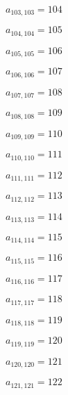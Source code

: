 \documentclass[a4paper,12pt]{article}
\begin{document}
$a _{ 103, 103 } = 104$

$a _{ 104, 104 } = 105$

$a _{ 105, 105 } = 106$

$a _{ 106, 106 } = 107$

$a _{ 107, 107 } = 108$

$a _{ 108, 108 } = 109$

$a _{ 109, 109 } = 110$

$a _{ 110, 110 } = 111$

$a _{ 111, 111 } = 112$

$a _{ 112, 112 } = 113$

$a _{ 113, 113 } = 114$

$a _{ 114, 114 } = 115$

$a _{ 115, 115 } = 116$

$a _{ 116, 116 } = 117$

$a _{ 117, 117 } = 118$

$a _{ 118, 118 } = 119$

$a _{ 119, 119 } = 120$

$a _{ 120, 120 } = 121$

$a _{ 121, 121 } = 122$
\end{document}
